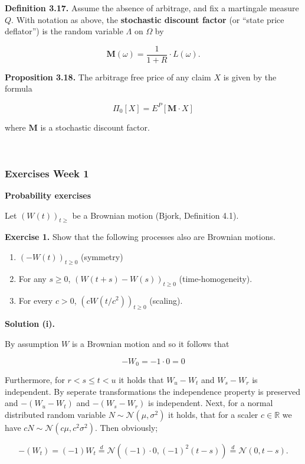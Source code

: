 \documentclass[
]{article}
\providecommand{\tightlist}{%
  \setlength{\itemsep}{0pt}\setlength{\parskip}{0pt}}
\begin{document}
\textbf{Definition 3.17.} Assume the absence of arbitrage, and fix a
martingale measure \(Q\). With notation as above, the \textbf{stochastic
discount factor} (or ``state price deflator'') is the random variable
\(\Lambda\) on \(\Omega\) by

\[
\mathbf{M}(\omega)=\frac{1}{1+R}\cdot L(\omega).\tag{3.19}
\]

\textbf{Proposition 3.18.} The arbitrage free price of any claim \(X\)
is given by the formula

\[
\Pi_0[X]=E^P[\mathbf{M}\cdot X]
\]

where \(\mathbf{M}\) is a stochastic discount factor.

~

\hypertarget{exercises-week-1}{%
\subsubsection{Exercises Week 1}\label{exercises-week-1}}

\textbf{Probability exercises}

Let \((W(t))_{t\ge}\) be a Brownian motion (Bjork, Definition 4.1).

\textbf{Exercise 1.} Show that the following processes also are Brownian
motions.

\begin{enumerate}
\def\labelenumi{\roman{enumi}.}
\tightlist
\item
  \((-W(t))_{t\ge 0}\) (symmetry)
\item
  For any \(s\ge 0\), \((W(t+s)-W(s))_{t\ge 0}\) (time-homogeneity).
\item
  For every \(c>0\), \((cW(t/c^2))_{t\ge 0}\) (scaling).
\end{enumerate}

\textbf{Solution (i).}

By assumption \(W\) is a Brownian motion and so it follows that

\[-W_0=-1\cdot0=0\]

Furthermore, for \(r<s\le t< u\) it holds that \(W_u-W_t\) and
\(W_s-W_r\) is independent. By seperate transformations the independence
property is preserved and \(-(W_u-W_t)\) and \(-(W_s-W_r)\) is
independent. Next, for a normal distributed random variable
\(N\sim\mathcal{N}(\mu,\sigma^2)\) it holds, that for a scaler
\(c\in\mathbb{R}\) we have \(c N\sim\mathcal{N}(c\mu,c^2\sigma ^2)\).
Then obviously;

\[-(W_t)=(-1)W_t\stackrel{d}{=}\mathcal{N}((-1)\cdot0,(-1)^2(t-s))\stackrel{d}{=}\mathcal{N}( 0,t-s).\]
\end{document}
